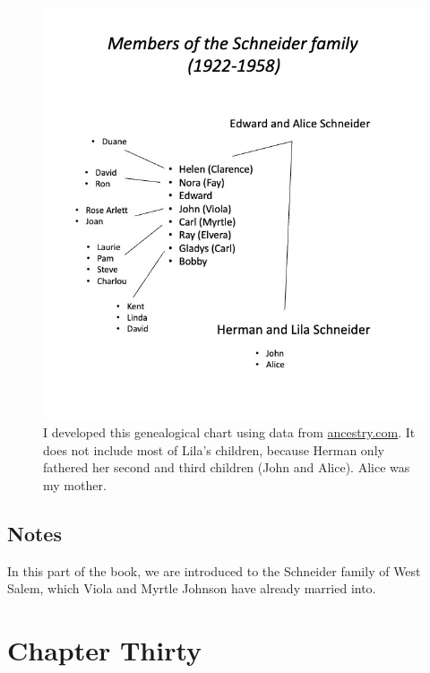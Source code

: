 \documentclass[
  letterpaper,
]{book}
\begin{document}
\begin{figure}[H]

{\centering \includegraphics[width=0.85\linewidth,height=\textheight,keepaspectratio]{images/Akou17.jpeg}

}

\caption[Members of the Schneider Family 1922--1958]{I developed this
genealogical chart using data from
\href{https://www.ancestry.com/}{ancestry.com}. It does not include most
of Lila's children, because Herman only fathered her second and third
children (John and Alice). Alice was my mother.}

\end{figure}%

\section{Notes}\label{notes-31}

In this part of the book, we are introduced to the Schneider family of
West Salem, which Viola and Myrtle Johnson have already married into.


\chapter{Chapter Thirty}\label{chapter-thirty}
\end{document}
